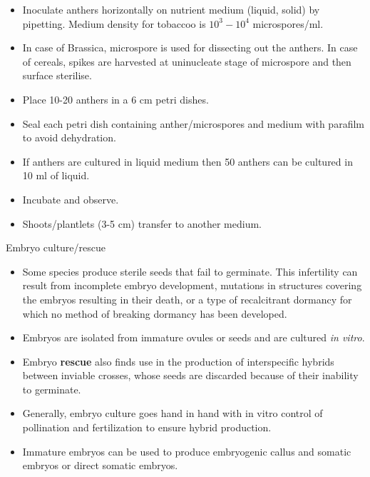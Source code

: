 \documentclass[
  ignorenonframetext,
  aspectratio=169]{beamer}
\providecommand{\tightlist}{%
  \setlength{\itemsep}{0pt}\setlength{\parskip}{0pt}}
\begin{document}
\begin{frame}{}
\protect\hypertarget{section-4}{}
\begin{itemize}
\tightlist
\item
  Inoculate anthers horizontally on nutrient medium (liquid, solid) by
  pipetting. Medium density for tobaccoo is \(10^3-10^4\)
  microspores/ml.
\item
  In case of Brassica, microspore is used for dissecting out the
  anthers. In case of cereals, spikes are harvested at uninucleate stage
  of microspore and then surface sterilise.
\item
  Place 10-20 anthers in a 6 cm petri dishes.
\item
  Seal each petri dish containing anther/microspores and medium with
  parafilm to avoid dehydration.
\item
  If anthers are cultured in liquid medium then 50 anthers can be
  cultured in 10 ml of liquid.
\item
  Incubate and observe.
\item
  Shoots/plantlets (3-5 cm) transfer to another medium.
\end{itemize}
\end{frame}

\begin{frame}{Embryo culture/rescue}
\protect\hypertarget{embryo-culturerescue}{}
\begin{itemize}
\tightlist
\item
  Some species produce sterile seeds that fail to germinate. This
  infertility can result from incomplete embryo development, mutations
  in structures covering the embryos resulting in their death, or a type
  of recalcitrant dormancy for which no method of breaking dormancy has
  been developed.
\item
  Embryos are isolated from immature ovules or seeds and are cultured
  \emph{in vitro}.
\item
  Embryo \textbf{rescue} also finds use in the production of
  interspecific hybrids between inviable crosses, whose seeds are
  discarded because of their inability to germinate.
\item
  Generally, embryo culture goes hand in hand with in vitro control of
  pollination and fertilization to ensure hybrid production.
\item
  Immature embryos can be used to produce embryogenic callus and somatic
  embryos or direct somatic embryos.
\end{itemize}
\end{frame}
\end{document}
